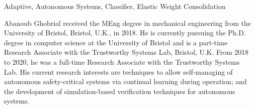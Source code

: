\documentclass[letterpaper, 10 pt, journal, twoside]{IEEEtran}
\begin{document}
\begin{IEEEkeywords}
Adaptive, Autonomous Systems, Classifier, Elastic Weight Consolidation
\end{IEEEkeywords}
\IEEEpeerreviewmaketitle 




\printbibliography


\begin{IEEEbiography}{Abanoub Ghobrial}
received the MEng degree in mechanical engineering from the University of Bristol, Bristol,  U.K., in 2018. He is currently pursuing the Ph.D. degree in computer science at the University of Bristol and is a part-time Research Associate with the Trustworthy Systems Lab, Bristol,  U.K. From 2018 to 2020, he was a full-time Research Associate with the Trustworthy Systems Lab. His current research interests are techniques to allow self-managing of autonomous safety-critical systems via continual learning during operation; and the development of simulation-based verification techniques for autonomous systems.
\end{IEEEbiography}
\end{document}
